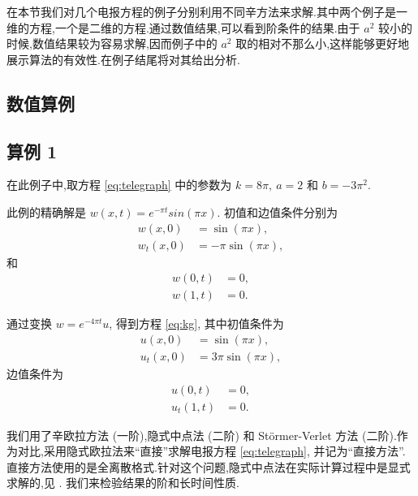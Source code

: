 在本节我们对几个电报方程的例子分别利用不同辛方法来求解.其中两个例子是一维的方程,一个是二维的方程.通过数值结果,可以看到阶条件的结果.由于 $a^2$ 较小的时候,数值结果较为容易求解,因而例子中的 $a^2$ 取的相对不那么小,这样能够更好地展示算法的有效性.在例子结尾将对其给出分析.

\subsection{数值算例}

\subsection*{算例 1}
在此例子中,取方程 \eqref{eq:telegraph} 中的参数为 $k = 8\pi,~a = 2$ 和 $b
= -3\pi^2$.

此例的精确解是 $w(x,t) = e^{-\pi t}sin(\pi x)$. 初值和边值条件分别为
\begin{equation*}
\begin{aligned}
w(x,0)&=\sin(\pi x),\\
w_t(x,0)&=-\pi \sin(\pi x),
\end{aligned}
\end{equation*}
和
\begin{equation*}
\begin{aligned}
w(0,t)&=0,\\
w(1,t)&=0.
\end{aligned}
\end{equation*}

通过变换 $w = e^{-4\pi t}u$, 得到方程 \eqref{eq:kg}, 其中初值条件为
\begin{equation*}
\begin{aligned}
u(x,0)&=\sin(\pi x),\\
u_t(x,0)&=3\pi \sin(\pi x),
\end{aligned}
\end{equation*}
边值条件为
\begin{equation*}
\begin{aligned}
u(0,t)&=0,\\
u_t(1,t)&=0.
\end{aligned}
\end{equation*}

我们用了辛欧拉方法 (一阶),隐式中点法 (二阶) 和 St\"{o}rmer-Verlet 方法 (二阶).作为对比,采用隐式欧拉法来``直接''求解电报方程 \eqref{eq:telegraph}, 并记为``直接方法''.直接方法使用的是全离散格式.针对这个问题,隐式中点法在实际计算过程中是显式求解的,见 \cite{feng2010symplectic}. 我们来检验结果的阶和长时间性质.

